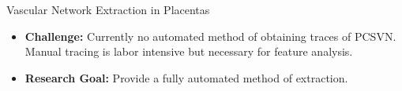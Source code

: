 \documentclass[9pt,notes]{beamer}
\begin{document}
\begin{frame}
\begin{columns}[c]
\begin{column}{0.5\textwidth}
\begin{block}{Vascular Network Extraction in Placentas}
\begin{itemize}
					\item \textbf{Challenge:}
						Currently no automated method of obtaining traces of
            PCSVN. Manual tracing is labor intensive but necessary
            for feature analysis.
					\item \textbf{Research Goal:} Provide a fully automated method of extraction.
          \end{itemize}
			\end{block}
		\end{column}
	\end{columns}
\end{frame}
\end{document}

